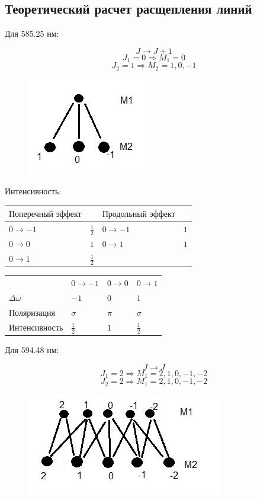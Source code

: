 \subsection{Теоретический расчет расщепления линий}
Для 585.25 нм:

$$J \rightarrow J+1$$
$$J_1=0 \Rightarrow M_1=0$$
$$J_2=1 \Rightarrow M_2 =1, 0, -1$$
\begin{figure}[H]
	\centering
	\includegraphics[width=0.3\linewidth]{fig/fig12}
	\caption{}
	\label{fig:fig12}
\end{figure}

Интенсивность:

\begin{tabular}{ | l | l | l | l |}
\hline
$\text{Поперечный эффект}$ & $ $ & $\text{Продольный эффект}$ & $ $ \\ \hline
$0 \rightarrow -1$ & $\frac12$ & $0 \rightarrow -1$ & $1$\\
$0 \rightarrow 0$ & $1$ & $0 \rightarrow 1$ & $1$\\
$0 \rightarrow 1$ & $\frac12$ & $ $ & $ $\\
\hline
\end{tabular}

\begin{tabular}{ | l | l | l | l |}
\hline
$ $ & $0 \rightarrow -1$ & $0 \rightarrow 0$ & $0 \rightarrow 1$ \\
$\Delta \omega$ & $-1$ & $0$ & $1$ \\
$\text{Поляризация}$ & $\sigma$ & $\pi$ & $\sigma$\\
$\text{Интенсивность}$ & $\frac12$ & $1$ & $\frac12$\\
\hline
\end{tabular}

Для 594.48 нм:

$$J \rightarrow J$$
$$J_1=2 \Rightarrow M_1=2,1,0,-1,-2$$
$$J_2=2 \Rightarrow M_1=2,1,0,-1,-2$$
\begin{figure}[H]
	\centering
	\includegraphics[width=0.3\linewidth]{fig/fig13}
	\caption{}
	\label{fig:fig13}
\end{figure}

